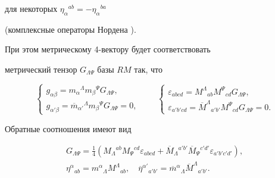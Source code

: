 для некоторых $\eta_\alpha{}^{ab}=-\eta_\alpha{}^{ba}$


(комплексные операторы Нордена \cite{6}).


При этом метрическому 4-вектору будет соответствовать


метрический тензор $G_{\Lambda\Psi}$ базы $RM$ так, что


$$




\begin{cases}


g_{\alpha\beta} = m_\alpha{}^\Lambda m_\beta{}^\Psi


G_{\Lambda\Psi},\\


g_{\alpha '\beta} = \overline m_{\alpha '}{}^\Lambda m_\beta{}^\Psi


G_{\Lambda\Psi}= 0,


\end{cases}


\qquad


\begin{cases}


\varepsilon_{abcd} = M^\Lambda{}_{ab} M^\Psi{}_{cd}


G_{\Lambda\Psi}, \\


\varepsilon_{a'b'cd} = \overline M^\Lambda{}_{a'b'} M^\Psi{}_{cd}


G_{\Lambda\Psi} = 0.


\end{cases}


$$


Обратные соотношения имеют вид


\begin{gather*}


G_{\Lambda\Psi}=\frac{1}{4}


(M_\Lambda{}^{ab}M_\Psi{}^{cd}\varepsilon_{abcd}+


\overline M_\Lambda{}^{a'b'}\overline M_\Psi{}^{c'd'}


\varepsilon_{a'b'c'd'}),\\




\eta^\alpha{}_{ab}=m^\alpha{}_\Lambda M^\Lambda{}_{ab},\quad


\overline \eta^{\alpha '}{}_{a'b'}=


\overline m^\alpha{}_\Lambda \overline M^\Lambda{}_{a'b'}.


\end{gather*}


